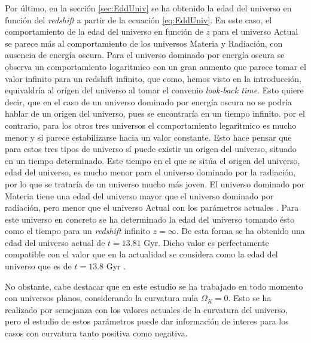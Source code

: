\documentclass[twoside]{article}
\begin{document}
			Por último, en la sección \ref{sec:EddUniv} se ha obtenido la edad del universo en función del \textit{redshift} a partir de la ecuación \ref{eq:EddUniv}. En este caso, el comportamiento de la edad del universo en función de $z$ para el universo Actual se parece más al comportamiento de los universos Materia y Radiación, con ausencia de energía oscura. Para el universo dominado por energía oscura se observa un comportamiento logaritmico con un gran aumento que parece tomar el valor infinito para un redshift infinito, que como, hemos visto en la introducción, equivaldría al orígen del universo al tomar el convenio \textit{look-back time}. Esto quiere decir, que en el caso de un universo dominado por energía oscura no se podría hablar de un origen del universo, pues se encontraría en un tiempo infinito. por el contrario, para los otros tres universos el comportamiento legaritmico es mucho menor y sí parece estabilizarse hacia un valor constante. Esto hace pensar que para estos tres tipos de universo sí puede existir un origen del universo, situado en un tiempo determinado. Este tiempo en el que se sitúa el origen del universo, edad del universo, es mucho menor para el universo dominado por la radiación, por lo que se trataría de un universo mucho más joven. El universo dominado por Materia tiene una edad del universo mayor que el universo dominado por radiación, pero menor que el universo Actual con los parámetros actuales \cite{Plank}. Para este universo en concreto se ha determinado la edad del universo tomando ésto como el tiempo para un \textit{redshift} infinito $z = \infty$. De esta forma se ha obtenido una edad del universo actual de $t = 13.81$ Gyr. Dicho valor es perfectamente compatible con el valor que en la actualidad se considera como la edad del universo que es de $t = 13.8$ Gyr \cite{NasaEdadUniv}.

			No obstante, cabe destacar que en este estudio se ha trabajado en todo momento con universos planos, considerando la curvatura nula $\Omega_K = 0$. Esto se ha realizado por semejanza con los valores actuales de la curvatura del universo, pero el estudio de estos parámetros puede dar información de interes para los casos con curvatura tanto positiva como negativa.


\newpage
\end{document}
